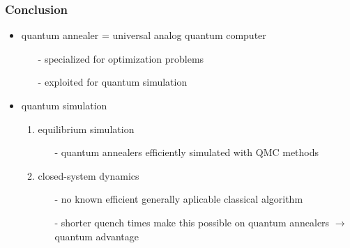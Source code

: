 \documentclass[11pt]{beamer}
\newcommand{\itemb}{\item[$\bullet$]}
\begin{document}
\begin{frame}
    \frametitle{Conclusion}
    \begin{itemize}
        \setlength{\itemindent}{-1em}
        \itemb quantum annealer = universal analog quantum computer
        \begin{itemize}
            \setlength{\itemindent}{-1em}
            \item [-] specialized for optimization problems
            \item [-] exploited for quantum simulation
        \end{itemize}
        \itemb quantum simulation
        \begin{enumerate}
            \setlength{\itemindent}{-1em}
            \item equilibrium simulation
            \begin{itemize}
                \setlength{\itemindent}{-1em}
                \item [-] quantum annealers efficiently simulated with QMC methods
            \end{itemize}
            \item closed-system dynamics
            \begin{itemize}
                \setlength{\itemindent}{-1em}
                \item [-] no known efficient generally aplicable classical algorithm
                \item [-] shorter quench times make this possible on quantum annealers $\to$ quantum advantage
            \end{itemize}
        \end{enumerate}
    \end{itemize}
\end{frame}
\end{document}
